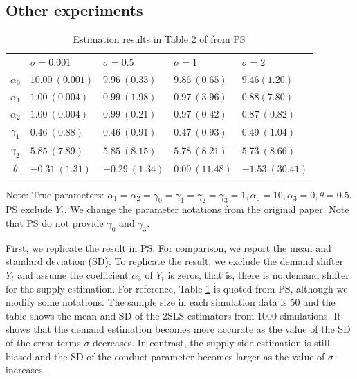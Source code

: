 \documentclass[11pt, a4paper]{article}
\begin{document}
\subsection{Other experiments}

\begin{table}[!htbp]
    \caption{Estimation results in Table 2 of from PS}
    \label{tb:linear_linear_sigma_Perloff_Shen}
    \begin{center}
        \begin{tabular}{cllll}
            \hline
            & $\sigma=0.001$ & $\sigma=0.5$ & $\sigma=1$ & $\sigma=2$ \\
            $\alpha_0$ & $10.00\ (0.001)$ & $9.96\ (0.33)$ & $9.86\ (0.65)$ & $9.46 (1.20)$ \\
            $\alpha_1$ & $1.00\ (0.004)$ & $0.99\ (1.98)$ & $0.97\ (3.96)$ & $0.88 (7.80)$ \\
            $\alpha_2$ & $1.00\ (0.004)$ & $0.99\ (0.21)$ & $0.97\ (0.42)$ & $0.87\ (0.82)$ \\
            $\gamma_1$ & $0.46\ (0.88)$ & $0.46\ (0.91)$ & $0.47\ (0.93)$ & $0.49\ (1.04)$ \\
            $\gamma_2$ & $5.85\ (7.89)$ & $5.85\ (8.15)$ & $5.78\ (8.21)$ & $5.73\ (8.66)$ \\
            $\theta$ & $-0.31\ (1.31)$ & $-0.29\ (1.34)$ & $0.09\ (11.48)$ & $-1.53\ (30.41)$ \\
            \hline
        \end{tabular}
    \end{center}\footnotesize
    Note: True parameters: $\alpha_1 = \alpha_2 = \gamma_0 = \gamma_1 = \gamma_2  = \gamma_3 = 1, \alpha_0 = 10, \alpha_3 = 0,  \theta = 0.5$. PS exclude $Y_t$. We change the parameter notations from the original paper. Note that PS do not provide $\gamma_0$ and $\gamma_3$.
\end{table}

First, we replicate the result in PS. For comparison, we report the mean and standard deviation (SD).
To replicate the result, we exclude the demand shifter $Y_t$ and assume the coefficient $\alpha_3$ of $Y_t$ is zeros, that is, there is no demand shifter for the supply estimation.
For reference, Table \ref{tb:linear_linear_sigma_Perloff_Shen} is quoted from PS, although we modify some notations.
The sample size in each simulation data is 50 and the table shows the mean and SD of the 2SLS estimators from 1000 simulations.
It shows that the demand estimation becomes more accurate as the value of the SD of the error terms $\sigma$ decreases.
In contrast, the supply-side estimation is still biased and the SD of the conduct parameter becomes larger as the value of $\sigma$ increases.
\end{document}
